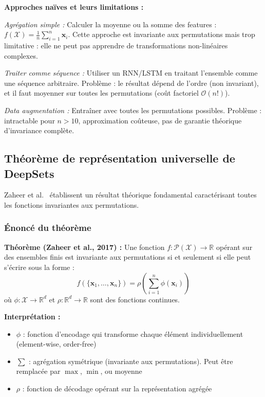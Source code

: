 \textbf{Approches naïves et leurs limitations :}

\textit{Agrégation simple :}
Calculer la moyenne ou la somme des features : $f(\mathcal{X}) = \frac{1}{n}\sum_{i=1}^n \mathbf{x}_i$. Cette approche est invariante aux permutations mais trop limitative : elle ne peut pas apprendre de transformations non-linéaires complexes.

\textit{Traiter comme séquence :}
Utiliser un RNN/LSTM en traitant l'ensemble comme une séquence arbitraire. Problème : le résultat dépend de l'ordre (non invariant), et il faut moyenner sur toutes les permutations (coût factoriel $\mathcal{O}(n!)$).

\textit{Data augmentation :}
Entraîner avec toutes les permutations possibles. Problème : intractable pour $n > 10$, approximation coûteuse, pas de garantie théorique d'invariance complète.

\subsection{Théorème de représentation universelle de DeepSets}

Zaheer et al.~\cite{Zaheer2017} établissent un résultat théorique fondamental caractérisant toutes les fonctions invariantes aux permutations.

\subsubsection{Énoncé du théorème}

\textbf{Théorème (Zaheer et al., 2017) :}
Une fonction $f: \mathcal{P}(\mathcal{X}) \to \mathbb{R}$ opérant sur des ensembles finis est invariante aux permutations si et seulement si elle peut s'écrire sous la forme :
\[
f(\{\mathbf{x}_1, \ldots, \mathbf{x}_n\}) = \rho\left(\sum_{i=1}^n \phi(\mathbf{x}_i)\right)
\]
où $\phi: \mathcal{X} \to \mathbb{R}^d$ et $\rho: \mathbb{R}^d \to \mathbb{R}$ sont des fonctions continues.

\textbf{Interprétation :}
\begin{itemize}
    \item $\phi$ : fonction d'encodage qui transforme chaque élément individuellement (element-wise, order-free)
    \item $\sum$ : agrégation symétrique (invariante aux permutations). Peut être remplacée par $\max$, $\min$, ou moyenne
    \item $\rho$ : fonction de décodage opérant sur la représentation agrégée
\end{itemize}

